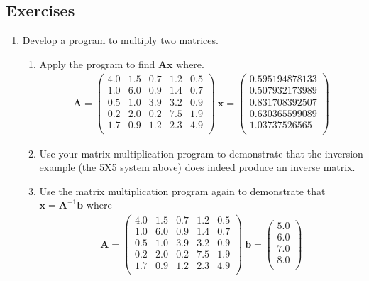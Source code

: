 \subsection{Exercises}
\begin{enumerate}
\item Develop a program to multiply two matrices.  
\begin{enumerate}
\item Apply the program to find $\mathbf{A}\mathbf{x}$ where.
\begin{gather}
\mathbf{A} =
\begin{pmatrix}
4.0 &  1.5 & 0.7 & 1.2 & 0.5 \\
1.0 & 6.0 & 0.9 & 1.4 & 0.7 \\
0.5 & 1.0 & 3.9 & 3.2 & 0.9 \\
0.2 & 2.0 & 0.2 & 7.5 & 1.9  \\
1.7 & 0.9 & 1.2 & 2.3 & 4.9 \\
\end{pmatrix}
~ \mathbf{x} = 
\begin{pmatrix}
0.595194878133 \\
0.507932173989 \\
0.831708392507 \\
0.630365599089 \\ 
1.03737526565 \\
\end{pmatrix}
\end{gather}
\item Use your matrix multiplication program to demonstrate that the inversion example (the 5X5 system above) does indeed produce an inverse matrix.
\item Use the matrix multiplication program again to demonstrate that $\mathbf{x} = \mathbf{A}^{-1} \mathbf{b}$ where
\begin{gather}
\mathbf{A} =
\begin{pmatrix}
4.0 &  1.5 & 0.7 & 1.2 & 0.5 \\
1.0 & 6.0 & 0.9 & 1.4 & 0.7 \\
0.5 & 1.0 & 3.9 & 3.2 & 0.9 \\
0.2 & 2.0 & 0.2 & 7.5 & 1.9  \\
1.7 & 0.9 & 1.2 & 2.3 & 4.9 \\
\end{pmatrix}
~ \mathbf{b} = 
\begin{pmatrix}
5.0 \\
6.0 \\
7.0 \\
8.0 \\ 

\end{pmatrix}
\end{gather}
\end{enumerate}
\end{enumerate}
